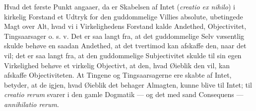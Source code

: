 \documentclass[12pt]{book}
\begin{document}
Hvad det første Punkt angaaer, da er Skabelsen af Intet
(\textit{creatio ex nihilo}) i kirkelig Forstand et Udtryk for den
guddommelige Villies absolute, ubetingede Magt over Alt, hvad
vi i Virkelighedens Forstand kalde Andethed, Objectivitet,
Tingsaarsager o. s. v. Det er saa langt fra, at det guddommelige
Selv væsentlig skulde behøve en saadan Andethed, at det
tvertimod kan afskaffe den, naar det vil; det er saa langt fra,
at den guddommelige Subjectivitet skulde til sin egen Virkelighed
behøve et virkelig Objectivt, at den, hvad Øieblik den
vil, kan afskaffe Objectiviteten. At Tingene og Tingsaarsagerne
ere skabte af Intet, betyder, at de igjen, hvad Øieblik det behager
Almagten, kunne blive til Intet; til \textit{creatio rerum}
svarer i den gamle Dogmatik --- og det med sand Consequens
--- \textit{annihilatio rerum}.
\end{document}
